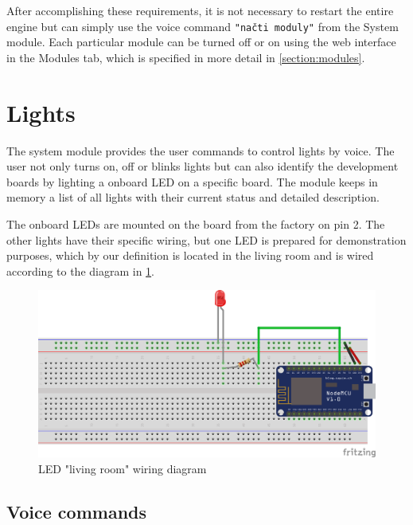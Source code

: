 After accomplishing these requirements, it is not necessary to restart the entire engine but can simply use the voice command \texttt{"načti moduly"} from the System module. Each particular module can be turned off or on using the web interface in the Modules tab, which is specified in more detail in \cref{section:modules}.

\section{Lights}

The system module provides the user commands to control lights by voice. The user not only turns on, off or blinks lights but can also identify the development boards by lighting a onboard LED on a specific board. The module keeps in memory a list of all lights with their current status and detailed description.

The onboard LEDs are mounted on the board from the factory on pin 2. The other lights have their specific wiring, but one LED is prepared for demonstration purposes, which by our definition is located in the living room and is wired according to the diagram in \cref{fig:led_schema}. 

\begin{figure}[H]
	\centering
	\includegraphics[width=\textwidth]{img/led_schema.png}
	\caption{LED "living room" wiring diagram}
	\label{fig:led_schema}
\end{figure}

\subsection{Voice commands}


